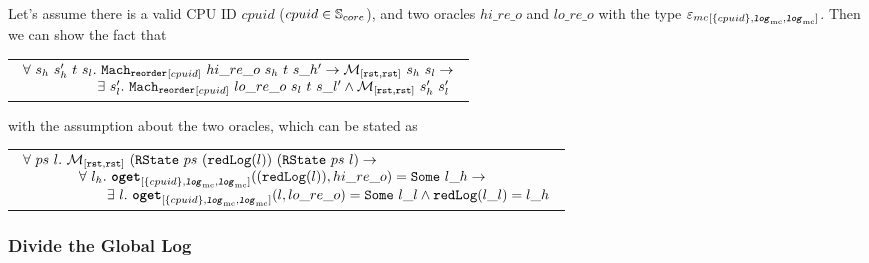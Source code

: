 \begin{lemma}
\label{lemma:chapter:conlink:reorder-refines-reorder}
Let's assume  there is a valid CPU ID $cpuid$ ($cpuid \in {\mathbb{S}_{core}}$),
and two oracles $hi\_re\_o$ and $lo\_re\_o $ with the type
${{{\varepsilon_{mc}}}_{[{\{cpuid\}}, {{{\mathrm{\texttt{\textbf{\textit{log}}}}}_{\mathrm{mc}}}}, {{{\mathrm{\texttt{\textbf{\textit{log}}}}}_{\mathrm{mc}}}}]}}$. Then we can show the fact that
\begin{center}
\begin{tabular}{P{0.95\textwidth}}
$
\begin{array}{l}
\forall \ s_h \ s_h' \ t \ s_l . \ \singlereorderstep{cpuid}{hi\_re\_o}{s_h}{t}{s\_h'} \rightarrow \matchrrstaterrstae{s_h}{s_l} \rightarrow \\
\ \ \ \ \ \ \ \ \ \ \ \ \ \ \ \ \exists\ s_l' . \  \singlereorderstep{cpuid}{lo\_re\_o}{s_l}{t}{s\_l'} \wedge  \matchrrstaterrstae{s_h'}{s_l'}\\
\end{array}
$
\end{tabular}
\end{center}
with the assumption about the two oracles, which can be stated as
\begin{center}
\begin{tabular}{P{0.95\textwidth}}
$
\begin{array}{l}
\forall \ ps \ l.\ \matchrrstaterrstae{(\rstate{ps}{(\mcreducelogfuncnoeq{l})}}{(\rstate{ps}{l})} \rightarrow \\
\ \ \ \ \ \ \ \ \ \ \ \ \forall \ l_h. \ \oget{\set{cpuid}}{\mclog}{\mclog}{(\mcreducelogfuncnoeq{l})}{hi\_re\_o}{l\_h} \rightarrow \\
\ \ \ \ \ \ \ \ \ \ \ \ \ \ \ \ \ \ \exists \ l. \ \oget{\set{cpuid}}{\mclog}{\mclog}{l}{lo\_re\_o}{l\_l} \wedge \mcreducelogfunc{l\_l}{l\_h} \\
\end{array}
$
\end{tabular}
\end{center}
\end{lemma}

\subsubsection{Divide the Global Log}

